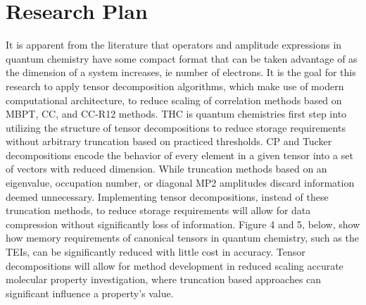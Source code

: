 \section{Research Plan}
	It is apparent from the literature that operators and amplitude expressions in quantum chemistry have some compact format that can be taken advantage of as the dimension of a system increases, ie number of electrons. It is the goal for this research to apply tensor decomposition algorithms, which make use of modern computational architecture, to reduce scaling of correlation methods based on MBPT, CC, and CC-R12 methods. 
	THC is quantum chemistries first step into utilizing the structure of tensor decompositions to reduce storage requirements without arbitrary truncation based on practiced thresholds.%
	CP and Tucker decompositions encode the behavior of every element in a given tensor into a set of vectors with reduced dimension. 
	While truncation methods based on an eigenvalue, occupation number, or diagonal MP2 amplitudes discard information deemed unnecessary. Implementing tensor decompositions, instead of these truncation methods, to reduce storage requirements will allow for data compression without significantly loss of information. Figure 4 and 5, below, show how memory requirements of canonical tensors in quantum chemistry, such as the TEIs, can be significantly reduced with little cost in accuracy.  Tensor decompositions will allow for method development in reduced scaling accurate molecular property investigation, where truncation based approaches can significant influence a property's value.

